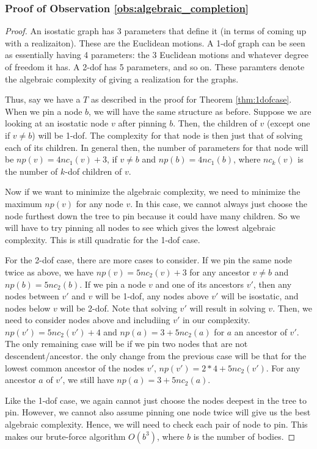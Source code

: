 \subsubsection{Proof of Observation \ref{obs:algebraic_completion}}
\begin{proof}
    An isostatic graph has 3 parameters that define it (in terms of coming up with a realizaiton). These are the Euclidean motions. A 1-dof graph can be seen as essentially having 4 parameters: the 3 Euclidean motions and whatever degree of freedom it has. A 2-dof has 5 parameters, and so on. These paramters denote the algebraic complexity of giving a realization for the graphs.

    Thus, say we have a $T$ as described in the proof for Theorem \ref{thm:1dofcase}. When we pin a node $b$, we will have the same structure as before. Suppose we are looking at an isostatic node $v$ after pinning $b$. Then, the children of $v$ (except one if $v \neq b$) will be 1-dof. The complexity for that node is then just that of solving each of its children. In general then, the number of parameters for that node will be $np(v) = 4nc_1(v)+3$, if $v \neq b$ and $np(b) = 4nc_1(b)$, where $nc_k(v)$ is the number of $k$-dof children of $v$.

    Now if we want to minimize the algebraic complexity, we need to minimize the maximum $np(v)$ for any node $v$. In this case, we cannot always just choose the node furthest down the tree to pin because it could have many children. So we will have to try pinning all nodes to see which gives the lowest algebraic complexity. This is still quadratic for the 1-dof case.

    For the 2-dof case, there are more cases to consider. If we pin the same node twice as above, we have $np(v) = 5nc_2(v)+3$ for any ancestor $v \neq b$ and $np(b) = 5nc_2(b)$. If we pin a node $v$ and one of its ancestors $v'$, then any nodes between $v'$ and $v$ will be 1-dof, any nodes above $v'$ will be isostatic, and nodes below $v$ will be 2-dof. Note that solving $v'$ will result in solving $v$. Then, we need to consider nodes above and includiing $v'$ in our complexity. $np(v') = 5nc_2(v') + 4$ and $np(a) = 3 + 5nc_2(a)$ for $a$ an ancestor of $v'$. The only remaining case will be if we pin two nodes that are not descendent/ancestor. the only change from the previous case will be that for the lowest common ancestor of the nodes $v'$, $np(v') = 2*4+5nc_2(v')$. For any ancestor $a$ of $v'$, we still have $np(a) = 3 + 5nc_2(a)$.

    Like the 1-dof case, we again cannot just choose the nodes deepest in the tree to pin. However, we cannot also assume pinning one node twice will give us the best algebraic complexity. Hence, we will need to check each pair of node to pin. This makes our brute-force algorithm $O(b^3)$, where $b$ is the number of bodies.
\end{proof}
